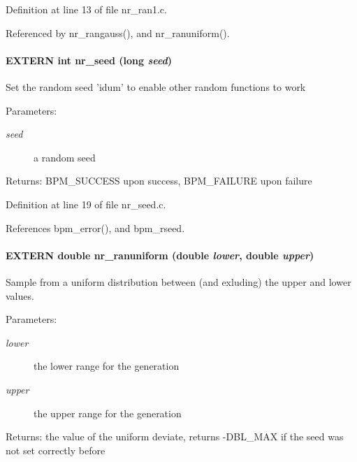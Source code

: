 Definition at line 13 of file nr\_\-ran1.c.

Referenced by nr\_\-rangauss(), and nr\_\-ranuniform().
\paragraph[nr\_\-seed]{\setlength{\rightskip}{0pt plus 5cm}EXTERN int nr\_\-seed (long {\em seed})}\hfill\label{group__nr_g9101b7bbebc15cd29262eed82cc86cd1}


Set the random seed 'idum' to enable other random functions to work

\begin{Desc}
\item[Parameters:]
\begin{description}
\item[{\em seed}]a random seed\end{description}
\end{Desc}
\begin{Desc}
\item[Returns:]BPM\_\-SUCCESS upon success, BPM\_\-FAILURE upon failure \end{Desc}


Definition at line 19 of file nr\_\-seed.c.

References bpm\_\-error(), and bpm\_\-rseed.
\paragraph[nr\_\-ranuniform]{\setlength{\rightskip}{0pt plus 5cm}EXTERN double nr\_\-ranuniform (double {\em lower}, \/  double {\em upper})}\hfill\label{group__nr_g1236b82d75cb62e306de0144911178cc}


Sample from a uniform distribution between (and exluding) the upper and lower values.

\begin{Desc}
\item[Parameters:]
\begin{description}
\item[{\em lower}]the lower range for the generation \item[{\em upper}]the upper range for the generation\end{description}
\end{Desc}
\begin{Desc}
\item[Returns:]the value of the uniform deviate, returns -DBL\_\-MAX if the seed was not set correctly before \end{Desc}


